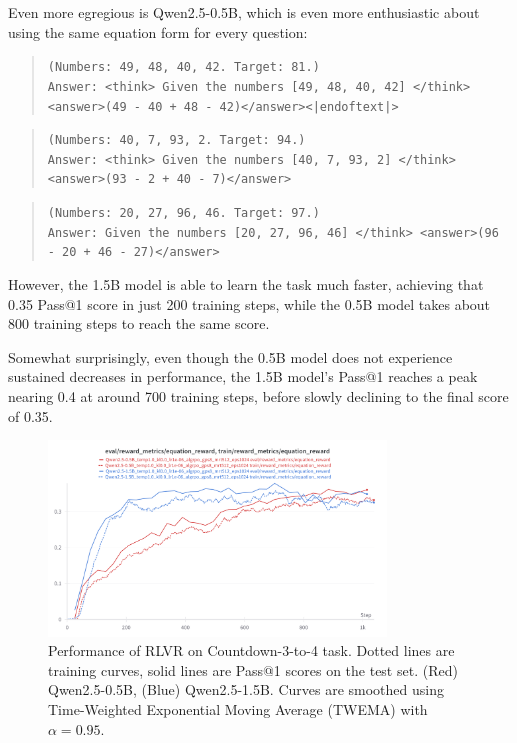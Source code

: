 \documentclass{article} %
\theoremstyle{definition}
\begin{document}
Even more egregious is Qwen2.5-0.5B, which is even more enthusiastic about using the 
same equation form for every question:
\begin{quote}
    \texttt{(Numbers: 49, 48, 40, 42. Target: 81.)} \\
    \texttt{Answer: <think> Given the numbers [49, 48, 40, 42] </think>
<answer>(49 - 40 + 48 - 42)</answer><|endoftext|>}
\end{quote}
\begin{quote}
    \texttt{(Numbers: 40, 7, 93, 2. Target: 94.)} \\
    \texttt{Answer: <think> Given the numbers [40, 7, 93, 2] </think>
    <answer>(93 - 2 + 40 - 7)</answer>}
\end{quote}
\begin{quote}
    \texttt{(Numbers: 20, 27, 96, 46. Target: 97.)} \\
    \texttt{Answer: Given the numbers [20, 27, 96, 46] </think>
    <answer>(96 - 20 + 46 - 27)</answer>}
\end{quote}


However, the 1.5B model is able to learn the task much faster,
achieving that 0.35 Pass@1 score in just 200 training steps, 
while the 0.5B model takes about 800 training steps to reach the same score.

Somewhat surprisingly, even though the 0.5B model does not experience
sustained decreases in performance, the 1.5B model's Pass@1 reaches a peak
nearing 0.4 at around 700 training steps, before slowly declining to the final score of 0.35.

\begin{figure}
    \centering
    \includegraphics[width=0.8\textwidth]{images/Countdown.png}
    \caption{
        Performance of RLVR on Countdown-3-to-4 task. 
        Dotted lines are training curves,
        solid lines are Pass@1 scores on the test set.
        (Red) Qwen2.5-0.5B, (Blue) Qwen2.5-1.5B.
        Curves are smoothed using Time-Weighted Exponential Moving Average (TWEMA) with $\alpha = 0.95$.
    }
    \label{fig:countdown-results}
\end{figure} 
\end{document}
